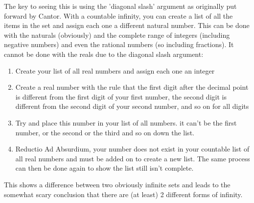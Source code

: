 The key to seeing this is using the 'diagonal slash' argument as 
originally put forward by Cantor. With a countable infinity, you can 
create a list of all the items in the set and assign each one a different natural number. 
This can be done with the naturals (obviously) and the complete range of 
integers (including negative numbers) and even the rational numbers 
(so including fractions). It cannot be done with the reals due to the diagonal slash argument:

\begin{enumerate}[1.]
 \item Create your list of all real numbers and assign each one an integer
 \item Create a real number with the rule that the first digit after the 
 decimal point is different from the first digit of your first number, 
 the second digit is different from the second digit of your second number, 
 and so on for all digits
 \item Try and place this number in your list of all numbers. it can't be the 
 first number, or the second or the third and so on down the list. 
 \item Reductio Ad Absurdium, your number does not exist in your countable 
 list of all real numbers and must be added on to create a new list. 
 The same process can then be done again to show the list still isn't complete.
\end{enumerate}

This shows a difference between two obviously infinite sets and leads to the 
somewhat scary conclusion that there are (at least) 2 different forms of infinity.
\es
\eqq
